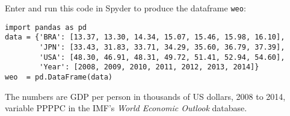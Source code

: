 \documentclass[11pt]{exam}
\begin{document}
\begin{questions}
\item Enter and run this code in Spyder to produce the dataframe \texttt{weo}:
\begin{verbatim}
import pandas as pd
data = {'BRA': [13.37, 13.30, 14.34, 15.07, 15.46, 15.98, 16.10],
        'JPN': [33.43, 31.83, 33.71, 34.29, 35.60, 36.79, 37.39],
        'USA': [48.30, 46.91, 48.31, 49.72, 51.41, 52.94, 54.60],
        'Year': [2008, 2009, 2010, 2011, 2012, 2013, 2014]}
weo  = pd.DataFrame(data)
\end{verbatim}
The numbers are GDP per person in thousands of US dollars, 2008 to 2014,
variable PPPPC in the IMF's {\it World Economic Outlook\/} database.


\end{questions}
\end{document}
